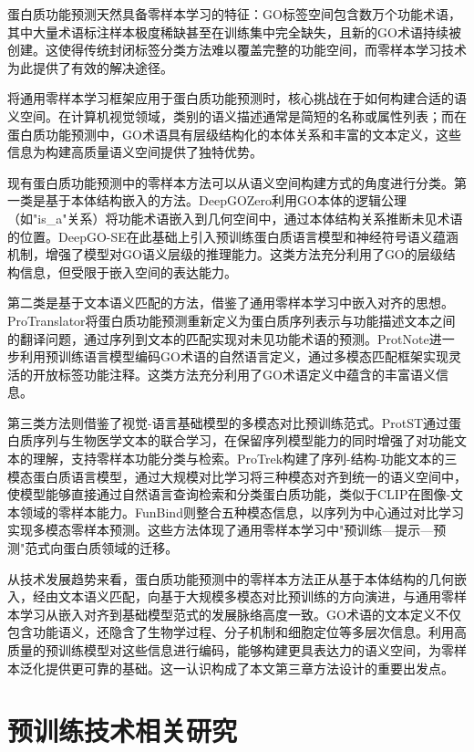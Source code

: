 蛋白质功能预测天然具备零样本学习的特征：GO标签空间包含数万个功能术语，其中大量术语标注样本极度稀缺甚至在训练集中完全缺失，且新的GO术语持续被创建。这使得传统封闭标签分类方法难以覆盖完整的功能空间，而零样本学习技术为此提供了有效的解决途径。

将通用零样本学习框架应用于蛋白质功能预测时，核心挑战在于如何构建合适的语义空间。在计算机视觉领域，类别的语义描述通常是简短的名称或属性列表；而在蛋白质功能预测中，GO术语具有层级结构化的本体关系和丰富的文本定义，这些信息为构建高质量语义空间提供了独特优势。

现有蛋白质功能预测中的零样本方法可以从语义空间构建方式的角度进行分类。第一类是基于本体结构嵌入的方法。DeepGOZero\cite{kulmanov2022deepgozero}利用GO本体的逻辑公理（如"is\_a"关系）将功能术语嵌入到几何空间中，通过本体结构关系推断未见术语的位置。DeepGO-SE\cite{kulmanov2024protein}在此基础上引入预训练蛋白质语言模型和神经符号语义蕴涵机制，增强了模型对GO语义层级的推理能力。这类方法充分利用了GO的层级结构信息，但受限于嵌入空间的表达能力。

第二类是基于文本语义匹配的方法，借鉴了通用零样本学习中嵌入对齐的思想。ProTranslator\cite{gao2022protranslator}将蛋白质功能预测重新定义为蛋白质序列表示与功能描述文本之间的翻译问题，通过序列到文本的匹配实现对未见功能术语的预测。ProtNote\cite{char2025protnote}进一步利用预训练语言模型编码GO术语的自然语言定义，通过多模态匹配框架实现灵活的开放标签功能注释。这类方法充分利用了GO术语定义中蕴含的丰富语义信息。

第三类方法则借鉴了视觉-语言基础模型的多模态对比预训练范式。ProtST\cite{xu2023protst}通过蛋白质序列与生物医学文本的联合学习，在保留序列模型能力的同时增强了对功能文本的理解，支持零样本功能分类与检索。ProTrek\cite{su2024protrek}构建了序列-结构-功能文本的三模态蛋白质语言模型，通过大规模对比学习将三种模态对齐到统一的语义空间中，使模型能够直接通过自然语言查询检索和分类蛋白质功能，类似于CLIP在图像-文本领域的零样本能力。FunBind\cite{boadu2025funbind}则整合五种模态信息，以序列为中心通过对比学习实现多模态零样本预测。这些方法体现了通用零样本学习中"预训练—提示—预测"范式向蛋白质领域的迁移。

从技术发展趋势来看，蛋白质功能预测中的零样本方法正从基于本体结构的几何嵌入，经由文本语义匹配，向基于大规模多模态对比预训练的方向演进，与通用零样本学习从嵌入对齐到基础模型范式的发展脉络高度一致。GO术语的文本定义不仅包含功能语义，还隐含了生物学过程、分子机制和细胞定位等多层次信息。利用高质量的预训练模型对这些信息进行编码，能够构建更具表达力的语义空间，为零样本泛化提供更可靠的基础。这一认识构成了本文第三章方法设计的重要出发点。

\section{预训练技术相关研究}

